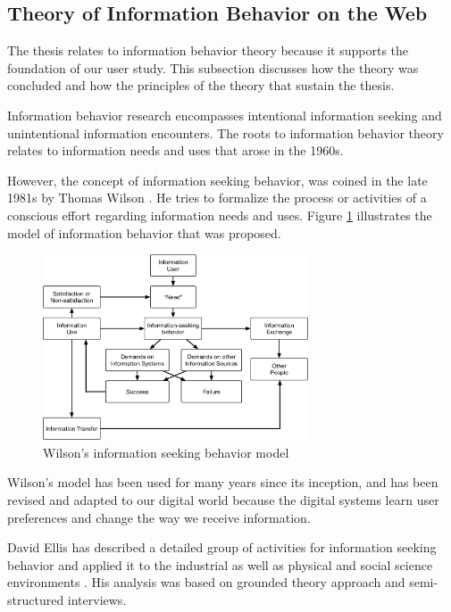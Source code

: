 \subsection{Theory of Information Behavior on the Web}
\label{sec:info-seek}

The thesis relates to information behavior theory because it supports the foundation of our
user study. This subsection discusses how the theory was concluded and 
how the principles of the theory that sustain the thesis.

Information behavior research encompasses intentional information seeking and 
unintentional information encounters. The roots to information behavior 
theory relates to information needs and uses \cite{doi:10.1002/aris.2009.1440430114} 
that arose in the 1960s.

However, the concept of information seeking behavior, was coined in the late 1981s 
by Thomas Wilson \cite{wilson1981user}. He tries to formalize the process or 
activities of a conscious effort regarding information needs 
and uses. Figure \ref{fig:wilson-info-seek} illustrates the model of information behavior 
that was proposed.

\begin{figure}
    \centering
    \includegraphics[width=0.7\textwidth]{figures/wilson-info-behavior}
    \caption{Wilson's information seeking behavior model \cite{wilson1981user}}
    \label{fig:wilson-info-seek}
\end{figure}

Wilson's model has been used for many years since its inception, and has been revised 
and adapted to our digital world because the digital systems learn user preferences and 
change \cite{giannini1998receiving} the way we receive information.

David Ellis has described a detailed group of activities for information seeking behavior \cite{ellis1989behavioural}
and applied it to the industrial as well as physical and social science \cite{ellis1993comparison} 
environments \cite{ellis1997modelling}.
His analysis was based on grounded theory approach \cite{aceto1994grounded} and semi-structured interviews. 

